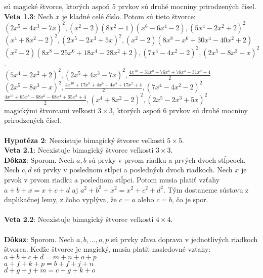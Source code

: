 \documentclass[12pt]{article}
\begin{document}
sú magické štvorce, ktorých aspoň $5$ prvkov sú druhé mocniny prirodzených čísel. \\

\textbf{Veta 1.3}: Nech $x$ je kladné celé číslo. Potom sú tieto štvorce: \\
$(2x^5 + 4x^3 - 7x)^2, (x^2 - 2)(8x^2 - 1)(x^6 - 6x^4 - 2), (5x^4 - 2x^2 + 2)^2$ \\
$(x^4 + 8x^2 - 2)^2, (2x^5 - 2x^3 + 5x)^2, (x^2 - 2)(8x^8 - x^6 + 30x^4 - 40x^2 + 2)$ \\
$(x^2 - 2)(8x^8 - 25x^6 + 18x^4 - 28x^2 + 2), (7x^4 - 4x^2 - 2)^2, (2x^5 - 8x^3 - x)^2$ \\
.\\
$(5x^4 - 2x^2 + 2)^2, (2x^5 + 4x^3 - 7x)^2, \frac{4x^{10} - 31x^8 + 76x^6 + 76x^4 - 31x^2 + 4}{2}$ \\
$(2x^5 - 8x^3 - x)^2, \frac{4x^{10} + 17x^8 + 4x^6 + 4x^4 + 17x^2 + 4}{2}, (7x^4 - 4x^2 - 2)^2$ \\
$\frac{4x^{10} + 65x^8 - 68x^6 - 68x^4 + 65x^2 + 4}{2}, (x^4 + 8x^2 - 2)^2, (2x^5 - 2x^3 + 5x)^2$ \\

magickými štvorcami veľkosti $3 \times 3$, ktorých aspoň $6$ prvkov sú druhé mocniny prirodzených čísel. \\\\

\textbf{Hypotéza 2}: Neexistuje bimagický štvorec veľkosti $5 \times 5$. \\

\textbf{Veta 2.1}: Neexistuje bimagický štvorec veľkosti $3 \times 3$. \\

\textbf{Dôkaz}: Sporom. Nech $a,b$ sú prvky v prvom riadku a prvých dvoch stĺpcoch. Nech $c,d$ sú prvky v poslednom stĺpci a posledných dvoch riadkoch. Nech $x$ je prvok v prvom riadku a poslednom stĺpci. Potom musia platiť vzťahy $a + b + x = x + c + d$ aj $a^2 + b^2 + x^2 = x^2 + c^2 + d^2$. Tým dostaneme sústavu z duplikačnej lemy, z čoho vyplýva, že $c = a$ alebo $c = b$, čo je spor. \\\\

\textbf{Veta 2.2}: Neexistuje bimagický štvorec veľkosti $4 \times 4$. \\\\

\textbf{Dôkaz}: Sporom. Nech $a, b, ... , o, p$ sú prvky zľava doprava v jednotlivých riadkoch štvorca. Keďže štvorec je magický, musia platiť nasledovné vzťahy: \\
$a + b + c + d = m + n + o + p$ \\
$a + f + k + p = b + f + j + n$ \\
$d + g + j + m = c + g + k + o$ \\
\end{document}
